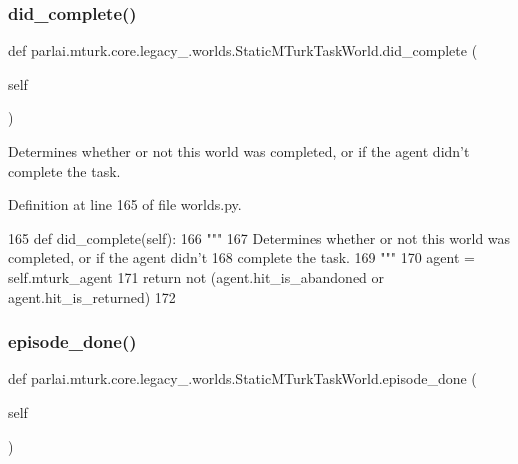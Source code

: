\subsubsection{\texorpdfstring{did\+\_\+complete()}{did\_complete()}}
{\footnotesize\ttfamily def parlai.\+mturk.\+core.\+legacy\+\_.\+worlds.\+Static\+M\+Turk\+Task\+World.\+did\+\_\+complete (\begin{DoxyParamCaption}\item[{}]{self }\end{DoxyParamCaption})}

\begin{DoxyVerb}Determines whether or not this world was completed, or if the agent didn't
complete the task.
\end{DoxyVerb}
 

Definition at line 165 of file worlds.\+py.


\begin{DoxyCode}
165     \textcolor{keyword}{def }did\_complete(self):
166         \textcolor{stringliteral}{"""}
167 \textcolor{stringliteral}{        Determines whether or not this world was completed, or if the agent didn't}
168 \textcolor{stringliteral}{        complete the task.}
169 \textcolor{stringliteral}{        """}
170         agent = self.mturk\_agent
171         \textcolor{keywordflow}{return} \textcolor{keywordflow}{not} (agent.hit\_is\_abandoned \textcolor{keywordflow}{or} agent.hit\_is\_returned)
172 
\end{DoxyCode}
\mbox{\label{classparlai_1_1mturk_1_1core_1_1legacy__2018_1_1worlds_1_1StaticMTurkTaskWorld_a02a802c1de6d6acd815ae83cbfd82eeb}} 
\subsubsection{\texorpdfstring{episode\+\_\+done()}{episode\_done()}}
{\footnotesize\ttfamily def parlai.\+mturk.\+core.\+legacy\+\_.\+worlds.\+Static\+M\+Turk\+Task\+World.\+episode\+\_\+done (\begin{DoxyParamCaption}\item[{}]{self }\end{DoxyParamCaption})}

